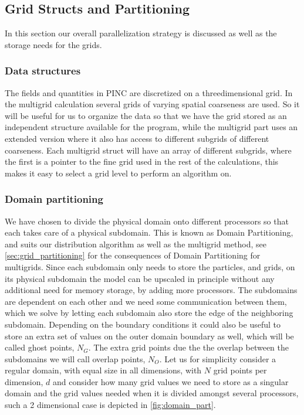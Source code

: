 	\subsection{Grid Structs and Partitioning}
		In this section our overall parallelization strategy is discussed as well
		as the storage needs for the grids.

	\subsubsection{Data structures}
	The fields and quantities in PINC are discretized on a threedimensional
	grid. In the multigrid calculation
	several grids of varying spatial coarseness are used. So it will
	be useful for us to organize the data so that we have the grid stored as an
	independent structure available for the program, while the multigrid part uses
	an extended version where it also has access to different subgrids of different
	coarseness. Each multigrid struct will have an array of different subgrids,
	where the first is a pointer to the fine grid used in the rest of the calculations,
	this makes it easy to select a grid level to perform an algorithm on.

	\subsubsection{Domain partitioning}
		We have chosen to divide the physical domain onto different processors so that each takes
		care of a physical subdomain. This is known as Domain Partitioning, and suits
		our distribution algorithm as well as the multigrid method, see \cref{sec:grid_partitioning}
		for the consequences of Domain Partitioning for multigrids. Since each
		subdomain only needs to store the particles, and grids, on its physical subdomain
		the model can be upscaled in principle without any additional need for memory storage,
		by adding more processors.
		The subdomains are dependent on each other and we need
		some communication between them, which we solve by letting each subdomain
		also store the edge of the neighboring subdomain. Depending on the boundary
		conditions it could also be useful to store an extra set of values on the
		outer domain boundary as well, which will be called ghost points, \(N_G\).
		The extra grid points due the the overlap between the subdomains we will call
		overlap points, \(N_O\). Let us for simplicity consider a regular domain,
		with equal size in all dimensions, with \(N\) grid points per dimension,
		\(d\) and consider how many grid values we need to store as a singular domain
		and the grid values needed when it is divided amongst several processors, such
		a 2 dimensional case is depicted in \cref{fig:domain_part}.

